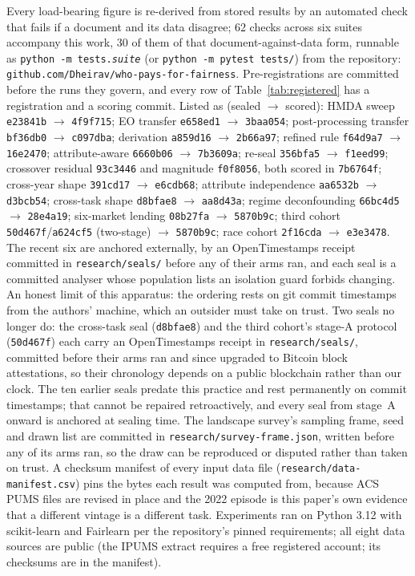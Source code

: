 \documentclass[conference]{IEEEtran}
\begin{document}
Every load-bearing figure is re-derived from stored results by an automated check that fails if
a document and its data disagree; 62 checks across six suites accompany this work, 30 of them
of that document-against-data form, runnable as
\texttt{python -m tests.\emph{suite}} (or \texttt{python -m pytest tests/}) from the
repository:
\texttt{github.com/Dheirav/who-pays-for-fairness}. Pre-registrations are committed before
the runs they govern, and every row of Table~\ref{tab:registered} has a registration and a
scoring commit. Listed as (sealed $\to$ scored): HMDA sweep \texttt{e23841b} $\to$
\texttt{4f9f715}; EO transfer \texttt{e658ed1} $\to$ \texttt{3baa054}; post-processing
transfer \texttt{bf36db0} $\to$ \texttt{c097dba}; derivation \texttt{a859d16} $\to$
\texttt{2b66a97}; refined rule \texttt{f64d9a7} $\to$ \texttt{16e2470}; attribute-aware
\texttt{6660b06} $\to$ \texttt{7b3609a}; re-seal \texttt{356bfa5} $\to$ \texttt{f1eed99};
crossover residual \texttt{93c3446} and magnitude \texttt{f0f8056}, both scored in
\texttt{7b6764f}; cross-year shape \texttt{391cd17} $\to$ \texttt{e6cdb68}; attribute
independence \texttt{aa6532b} $\to$ \texttt{d3bcb54}; cross-task shape
\texttt{d8bfae8} $\to$ \texttt{aa8d43a}; regime deconfounding \texttt{66bc4d5}
$\to$ \texttt{28e4a19}; six-market lending \texttt{08b27fa} $\to$ \texttt{5870b9c};
third cohort \texttt{50d467f}/\texttt{a624cf5} (two-stage) $\to$ \texttt{5870b9c};
race cohort \texttt{2f16cda} $\to$ \texttt{e3e3478}. The recent six are anchored
externally, by an OpenTimestamps receipt committed in \texttt{research/seals/} before any of
their arms ran, and each seal is a committed analyser whose population lists an isolation
guard forbids changing. An honest limit of this
apparatus: the ordering rests on git commit timestamps from the authors' machine, which
an outsider must take on trust. Two seals no longer do: the cross-task seal
(\texttt{d8bfae8}) and the third cohort's stage-A protocol (\texttt{50d467f}) each carry
an OpenTimestamps receipt in \texttt{research/seals/}, committed before their arms ran
and since upgraded to Bitcoin block attestations, so their chronology depends on a public
blockchain rather than our clock. The ten earlier seals predate this practice and rest
permanently on commit timestamps; that cannot be repaired retroactively, and every seal
from stage~A onward is anchored at sealing time. The landscape survey's sampling frame, seed and drawn list are committed in
\texttt{research/survey-frame.json}, written before any of its arms ran, so the draw can
be reproduced or disputed rather than taken on trust. A checksum manifest of every input data file
(\texttt{research/data-manifest.csv}) pins the bytes each result was computed from,
because ACS PUMS files are revised in place and the 2022 episode is this paper's own
evidence that a different vintage is a different task.
Experiments ran on Python 3.12 with scikit-learn and Fairlearn per the repository's pinned
requirements; all eight data sources are public (the IPUMS extract requires a free
registered account; its checksums are in the manifest).
\end{document}
